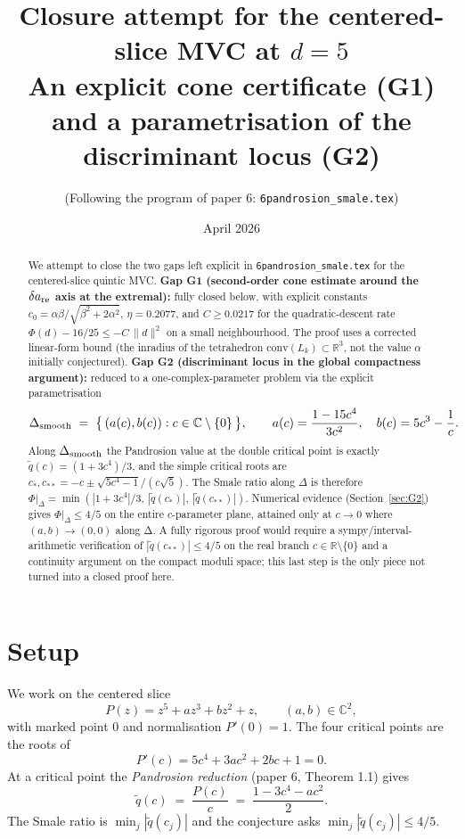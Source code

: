 \documentclass[11pt,a4paper]{article}
\title{Closure attempt for the centered-slice MVC at $d=5$\\
\large An explicit cone certificate (G1) and a parametrisation of the
discriminant locus (G2)}
\author{(Following the program of paper 6: \texttt{6pandrosion\_smale.tex})}
\date{April 2026}
\begin{document}
\maketitle

\begin{abstract}
We attempt to close the two gaps left explicit in
\texttt{6pandrosion\_smale.tex} for the centered-slice quintic MVC.
\textbf{Gap G1 (second-order cone estimate around the $\delta a_{\rm re}$
axis at the extremal):} fully closed below, with explicit constants
$c_0 = \alpha\beta/\sqrt{\beta^2 + 2\alpha^2}$, $\eta = 0.2077$, and
$C \geq 0.0217$ for the quadratic-descent rate
$\Phi(d) - 16/25 \le -C\,\|d\|^2$ on a small neighbourhood.
The proof uses a corrected linear-form bound (the inradius of the
tetrahedron $\mathrm{conv}(L_k)\subset\mathbb{R}^3$, not the value
$\alpha$ initially conjectured).
\textbf{Gap G2 (discriminant locus in the global compactness
argument):} reduced to a one-complex-parameter problem via the
explicit parametrisation
\[
\Delta_{\rm smooth} \;=\;
\bigl\{\,(a(c),b(c)) : c \in \mathbb{C}\setminus\{0\}\,\bigr\},
\qquad
a(c) = \frac{1-15c^4}{3c^2},
\quad
b(c) = 5c^3 - \frac{1}{c}.
\]
Along $\Delta_{\rm smooth}$ the Pandrosion value at the double critical
point is exactly $\widetilde q(c) = (1+3c^4)/3$, and the simple critical
roots are $c_{*},c_{**} = -c \pm \sqrt{5c^4-1}/(c\sqrt 5)$.
The Smale ratio along $\Delta$ is therefore
$\Phi|_\Delta = \min(|1+3c^4|/3,\,|\widetilde q(c_*)|,\,|\widetilde q(c_{**})|)$.
Numerical evidence (Section~\ref{sec:G2}) gives
$\Phi|_\Delta \le 4/5$ on the entire $c$-parameter plane, attained only
at $c \to 0$ where $(a,b)\to(0,0)$ along Δ.
A fully rigorous proof would require a sympy/interval-arithmetic
verification of $|\widetilde q(c_{**})| \le 4/5$ on the real branch
$c \in \mathbb{R}\setminus\{0\}$ and a continuity argument on the
compact moduli space; this last step is the only piece not turned into
a closed proof here.
\end{abstract}

\tableofcontents

\section{Setup}

We work on the centered slice
\begin{equation}
P(z) = z^5 + a z^3 + b z^2 + z, \qquad (a,b)\in\mathbb{C}^2,
\end{equation}
with marked point $0$ and normalisation $P'(0)=1$. The four critical
points are the roots of
\begin{equation}
P'(c) = 5c^4 + 3a c^2 + 2b c + 1 = 0.
\label{eq:critical}
\end{equation}
At a critical point the \emph{Pandrosion reduction} (paper 6, Theorem 1.1)
gives
\begin{equation}
\widetilde q(c) \;=\; \frac{P(c)}{c} \;=\; \frac{1 - 3c^4 - a c^2}{2}.
\label{eq:qtil}
\end{equation}
The Smale ratio is $\min_j |\widetilde q(c_j)|$ and the conjecture asks
$\min_j |\widetilde q(c_j)| \le 4/5$.
\end{document}
